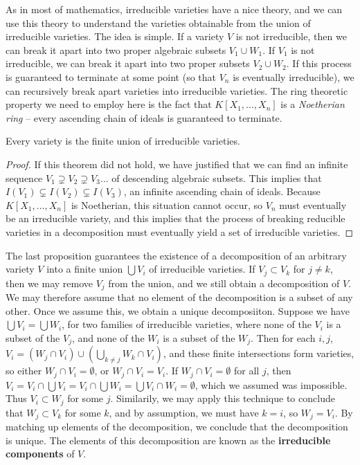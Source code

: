 As in most of mathematics, irreducible varieties have a nice theory, and we can use this theory to understand the varieties obtainable from the union of irreducible varieties. The idea is simple. If a variety $V$ is not irreducible, then we can break it apart into two proper algebraic subsets $V_1 \cup W_1$. If $V_1$ is not irreducible, we can break it apart into two proper subsets $V_2 \cup W_2$. If this process is guaranteed to terminate at some point (so that $V_n$ is eventually irreducible), we can recursively break apart varieties into irreducible varieties. The ring theoretic property we need to employ here is the fact that $K[X_1, \dots, X_n]$ is a {\it Noetherian ring} -- every ascending chain of ideals is guaranteed to terminate.

\begin{prop}
    Every variety is the finite union of irreducible varieties.
\end{prop}
\begin{proof}
    If this theorem did not hold, we have justified that we can find an infinite sequence $V_1 \supsetneq V_2 \supsetneq V_3 \dots$ of descending algebraic subsets. This implies that $I(V_1) \subsetneq I(V_2) \subsetneq I(V_3)$, an infinite ascending chain of ideals. Because $K[X_1, \dots, X_n]$ is Noetherian, this situation cannot occur, so $V_n$ must eventually be an irreducible variety, and this implies that the process of breaking reducible varieties in a decomposition must eventually yield a set of irreducible varieties.
\end{proof}

The last proposition guarantees the existence of a decomposition of an arbitrary variety $V$ into a finite union $\bigcup V_i$ of irreducible varieties. If $V_j \subset V_k$ for $j \neq k$, then we may remove $V_j$ from the union, and we still obtain a decomposition of $V$. We may therefore assume that no element of the decomposition is a subset of any other. Once we assume this, we obtain a unique decomposiiton. Suppose we have $\bigcup V_i = \bigcup W_i$, for two families of irreducible varieties, where none of the $V_i$ is a subset of the $V_j$, and none of the $W_i$ is a subset of the $W_j$. Then for each $i,j$, $V_i = (W_j \cap V_i) \cup (\bigcup_{k \neq j} W_k \cap V_i)$, and these finite intersections form varieties, so either $W_j \cap V_i = \emptyset$, or $W_j \cap V_i = V_i$. If $W_j \cap V_i = \emptyset$ for all $j$, then $V_i = V_i \cap \bigcup V_i = V_i \cap \bigcup W_i = \bigcup V_i \cap W_i = \emptyset$, which we assumed was impossible. Thus $V_i \subset W_j$ for some $j$. Similarily, we may apply this technique to conclude that $W_j \subset V_k$ for some $k$, and by assumption, we must have $k = i$, so $W_j = V_i$. By matching up elements of the decomposition, we conclude that the decomposition is unique. The elements of this decomposition are known as the {\bf irreducible components} of $V$.

